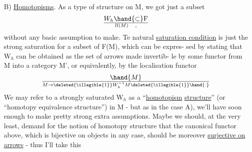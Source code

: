 B)  \uline{Homotopisms}.  As a type of structure on M, we got just a subset
\[ W_h \hand{\subset} \mathrm F\over{l}{l}(M) \quad , \]
without any basic assumption to make.  Te natural \uline{saturation condition}
is just the strong saturation for a subset of F(M),  which can be expres-%
sed by stating that W$_h$ can be obtained as the set of arrows made invertib-%
le by some functor from M into a category M',  or equivalently,  by the
localisation functor
\[ \hand{M}\over{M}{\to} \deleted{\illegible{1}} W_h^{-1}M \deleted{\illegible{1}} \hand{.} \]
We may refer to a strongly saturated W$_h$ as a ``\uline{homotopism} \uline{structure}''
(or ``homotopy equivalence structure'') in M  -  but as in the case A),
we'll have soon enough to make pretty strong extra assumptions.  Maybe
we should, at the very least,  demand for the notion of homotopy structure
that the canonical functor above,  which is bijective on objects in any
case,  should be moreover \uline{surjective on arrows}  -  thus I'll take this

